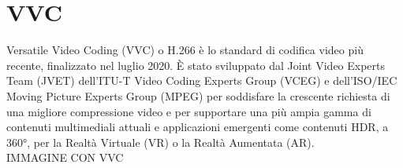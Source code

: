 \section{VVC}
Versatile Video Coding (VVC) o H.266 è lo standard di codifica video più recente, finalizzato nel luglio 2020. È stato sviluppato dal Joint Video Experts Team (JVET) dell'ITU-T Video Coding Experts Group (VCEG) e dell'ISO/IEC Moving Picture Experts Group (MPEG) per soddisfare la crescente richiesta di una migliore compressione video e per supportare una più ampia gamma di contenuti multimediali attuali e applicazioni emergenti come contenuti HDR, a 360°, per la Realtà Virtuale (VR) o la Realtà Aumentata (AR).\cite{9503377}\\
\newline
IMMAGINE CON VVC
